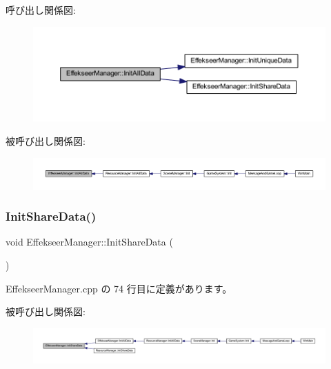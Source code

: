呼び出し関係図\+:\nopagebreak
\begin{figure}[H]
\begin{center}
\leavevmode
\includegraphics[width=350pt]{class_effekseer_manager_ac5744fba29048e417bf46a8fbf5a8e76_cgraph}
\end{center}
\end{figure}
被呼び出し関係図\+:
\nopagebreak
\begin{figure}[H]
\begin{center}
\leavevmode
\includegraphics[width=350pt]{class_effekseer_manager_ac5744fba29048e417bf46a8fbf5a8e76_icgraph}
\end{center}
\end{figure}
\mbox{\label{class_effekseer_manager_a881d9bdd981c35de66174363517050b4}} 
\subsubsection{\texorpdfstring{Init\+Share\+Data()}{InitShareData()}}
{\footnotesize\ttfamily void Effekseer\+Manager\+::\+Init\+Share\+Data (\begin{DoxyParamCaption}{ }\end{DoxyParamCaption})\hspace{0.3cm}{\ttfamily [static]}}



 Effekseer\+Manager.\+cpp の 74 行目に定義があります。

被呼び出し関係図\+:
\nopagebreak
\begin{figure}[H]
\begin{center}
\leavevmode
\includegraphics[width=350pt]{class_effekseer_manager_a881d9bdd981c35de66174363517050b4_icgraph}
\end{center}
\end{figure}
\mbox{\label{class_effekseer_manager_a95d9d2eda8cb691c2565d022198b5787}} 
